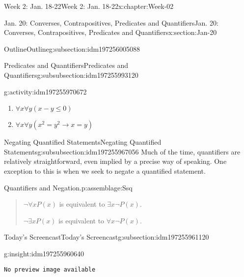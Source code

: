 \documentclass[oneside,10pt,]{book}
\newcommand{\mono}[1]{\texttt{#1}}
\numberwithin{equation}{section}
\newlength{\qrsize}
\newlength{\previewwidth}
\renewcommand{\le}{\leqslant}
\def\imp{\to}
\newcommand{\imp}{\rightarrow}
\begin{document}
\begin{chapterptx}{Week 2: Jan. 18-22}{}{Week 2: Jan. 18-22}{}{}{x:chapter:Week-02}
\begin{sectionptx}{Jan. 20: Converses, Contrapositives, Predicates and Quantifiers}{}{Jan. 20: Converses, Contrapositives, Predicates and Quantifiers}{}{}{x:section:Jan-20}
\begin{subsectionptx}{Outline}{}{Outline}{}{}{g:subsection:idm197256005088}
\begin{subsubsectionptx}{Predicates and Quantifiers}{}{Predicates and Quantifiers}{}{}{g:subsubsection:idm197255993120}
\begin{activity}{}{g:activity:idm197255970672}
\begin{enumerate}
\item{}\(\displaystyle \forall x \forall y (x-y \le 0)\)%
\item{}\(\displaystyle \forall x\forall y(x^2 = y^2 \imp x = y)\)%
\end{enumerate}
\end{activity}%
\end{subsubsectionptx}
%
%
\typeout{************************************************}
\typeout{************************************************}
%
\begin{subsubsectionptx}{Negating Quantified Statements}{}{Negating Quantified Statements}{}{}{g:subsubsection:idm197255967056}
Much of the time, quantifiers are relatively straightforward, even implied by a precise way of speaking. One exception to this is when we seek to negate a quantified statement.%
\begin{assemblage}{Quantifiers and Negation.}{p:assemblage:Ssq}%
\begin{quote}%
\(\neg \forall x P(x)\) is equivalent to \(\exists x \neg P(x)\).%
\par
\(\neg \exists x P(x)\) is equivalent to \(\forall x \neg P(x)\).%
\end{quote}
\end{assemblage}
\end{subsubsectionptx}
\end{subsectionptx}
%
%
\typeout{************************************************}
\typeout{************************************************}
%
\begin{subsectionptx}{Today's Screencast}{}{Today's Screencast}{}{}{g:subsection:idm197255961120}
\begin{insight}{}{g:insight:idm197255960640}%
\setlength{\qrsize}{9em}
\setlength{\previewwidth}{\linewidth}
\addtolength{\previewwidth}{-\qrsize}
\begin{tcbraster}[raster columns=2, raster column skip=1pt, raster halign=center, raster force size=false, raster left skip=0pt, raster right skip=0pt]%
\begin{tcolorbox}[previewstyle, width=\previewwidth]%
\mono{No preview image available}%
\end{tcolorbox}%
\begin{tcolorbox}[qrstyle]%
[QR LINK]\end{tcolorbox}%
\end{tcbraster}%
\end{insight}

\end{subsectionptx}
\end{sectionptx}
\end{chapterptx}
\end{document}
